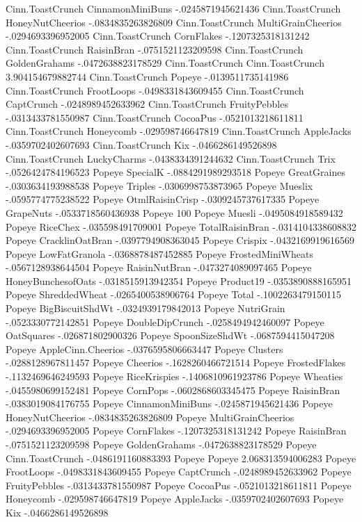 Cinn.ToastCrunch	CinnamonMiniBuns	-.0245871945621436
Cinn.ToastCrunch	HoneyNutCheerios	-.0834835263826809
Cinn.ToastCrunch	MultiGrainCheerios	-.0294693396952005
Cinn.ToastCrunch	CornFlakes	-.1207325318131242
Cinn.ToastCrunch	RaisinBran	-.0751521123209598
Cinn.ToastCrunch	GoldenGrahams	-.0472638823178529
Cinn.ToastCrunch	Cinn.ToastCrunch	3.904154679882744
Cinn.ToastCrunch	Popeye	-.0139511735141986
Cinn.ToastCrunch	FrootLoops	-.0498331843609455
Cinn.ToastCrunch	CaptCrunch	-.0248989452633962
Cinn.ToastCrunch	FruityPebbles	-.0313433781550987
Cinn.ToastCrunch	CocoaPus	-.0521013218611811
Cinn.ToastCrunch	Honeycomb	-.029598746647819
Cinn.ToastCrunch	AppleJacks	-.0359702402607693
Cinn.ToastCrunch	Kix	-.0466286149526898
Cinn.ToastCrunch	LuckyCharms	-.0438334391244632
Cinn.ToastCrunch	Trix	-.0526424784196523
Popeye	SpecialK	-.0884291989293518
Popeye	GreatGraines	-.0303634193988538
Popeye	Triples	-.0306998753873965
Popeye	Mueslix	-.0595774775238522
Popeye	OtmlRaisinCrisp	-.0309245737617335
Popeye	GrapeNuts	-.0533718560436938
Popeye	100%
Popeye	Muesli	-.0495084918589432
Popeye	RiceChex	-.035598491709001
Popeye	TotalRaisinBran	-.0314104338608832
Popeye	CracklinOatBran	-.0397794908363045
Popeye	Crispix	-.0432169919616569
Popeye	LowFatGranola	-.0368878487452885
Popeye	FrostedMiniWheats	-.0567128938644504
Popeye	RaisinNutBran	-.0473274089097465
Popeye	HoneyBunchesofOats	-.0318515913942354
Popeye	Product19	-.0353890888165951
Popeye	ShreddedWheat	-.0265400538906764
Popeye	Total	-.1002263479150115
Popeye	BigBiscuitShdWt	-.0324939179842013
Popeye	NutriGrain	-.0523330772142851
Popeye	DoubleDipCrunch	-.0258494942460097
Popeye	OatSquares	-.026871802900326
Popeye	SpoonSizeShdWt	-.0687594415047208
Popeye	AppleCinn.Cheerios	-.0376595806663447
Popeye	Clusters	-.0288128967811457
Popeye	Cheerios	-.1628260466721514
Popeye	FrostedFlakes	-.1132469646249593
Popeye	RiceKrispies	-.1406810961923786
Popeye	Wheaties	-.0455980699152481
Popeye	CornPops	-.0602868603345475
Popeye	RaisinBran	-.0383019084176755
Popeye	CinnamonMiniBuns	-.0245871945621436
Popeye	HoneyNutCheerios	-.0834835263826809
Popeye	MultiGrainCheerios	-.0294693396952005
Popeye	CornFlakes	-.1207325318131242
Popeye	RaisinBran	-.0751521123209598
Popeye	GoldenGrahams	-.0472638823178529
Popeye	Cinn.ToastCrunch	-.0486191160883393
Popeye	Popeye	2.068313594006283
Popeye	FrootLoops	-.0498331843609455
Popeye	CaptCrunch	-.0248989452633962
Popeye	FruityPebbles	-.0313433781550987
Popeye	CocoaPus	-.0521013218611811
Popeye	Honeycomb	-.029598746647819
Popeye	AppleJacks	-.0359702402607693
Popeye	Kix	-.0466286149526898
